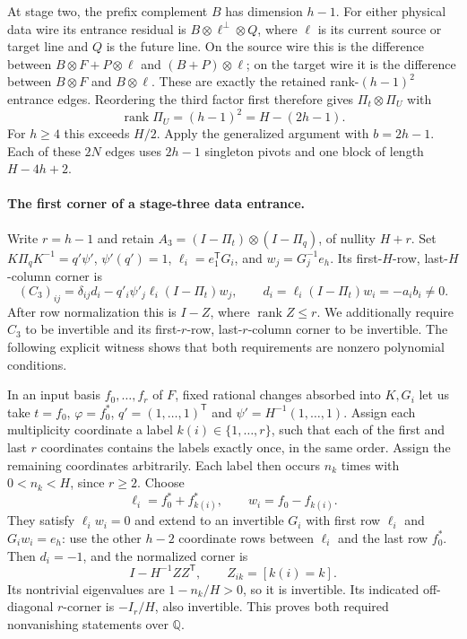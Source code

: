 At stage two, the prefix complement $B$ has dimension $h-1$.
For either physical data wire its entrance residual is
$B\otimes\ell^\perp\otimes Q$, where $\ell$ is its current source
or target line and $Q$ is the future line. On the source wire this
is the difference between $B\otimes F+P\otimes\ell$ and
$(B+P)\otimes\ell$; on the target wire it is the difference between
$B\otimes F$ and $B\otimes\ell$. These are exactly the retained
rank-$(h-1)^2$ entrance edges. Reordering the third factor first
therefore gives $\Pi_t\otimes\Pi_U$ with
\[
 \operatorname{rank}\Pi_U=(h-1)^2=H-(2h-1).
\]
For $h\ge4$ this exceeds $H/2$. Apply the generalized argument with
$b=2h-1$. Each of these $2N$ edges uses $2h-1$ singleton pivots and
one block of length $H-4h+2$.

\paragraph{The first corner of a stage-three data entrance.}
Write $r=h-1$ and retain
$A_3=(I-\Pi_t)\otimes(I-\Pi_q)$, of nullity $H+r$.
Set $K\Pi_qK^{-1}=q'\psi'$, $\psi'(q')=1$,
$\ell_i=e_1^{\mathsf T}G_i$, and $w_j=G_j^{-1}e_h$.
Its first-$H$-row, last-$H$-column corner is
\[
 (C_3)_{ij}=\delta_{ij}d_i-q'_i\psi'_j\ell_i(I-\Pi_t)w_j,
 \qquad d_i=\ell_i(I-\Pi_t)w_i=-a_i b_i\ne0.
\]
After row normalization this is $I-Z$, where $\operatorname{rank}Z\le r$.
We additionally require $C_3$ to be invertible and its first-$r$-row,
last-$r$-column corner to be invertible. The following explicit witness
shows that both requirements are nonzero polynomial conditions.

In an input basis $f_0,\ldots,f_r$ of $F$, fixed rational changes
absorbed into $K,G_i$ let us take $t=f_0$,
$\varphi=f_0^*$, $q'=(1,\ldots,1)^{\mathsf T}$ and
$\psi'=H^{-1}(1,\ldots,1)$. Assign each multiplicity coordinate a
label $k(i)\in\{1,\ldots,r\}$, such that each of the first and last
$r$ coordinates contains the labels exactly once, in the same order.
Assign the remaining coordinates arbitrarily. Each label then occurs
$n_k$ times with $0<n_k<H$, since $r\ge2$.
Choose
\[
 \ell_i=f_0^*+f_{k(i)}^*,\qquad
 w_i=f_0-f_{k(i)}.
\]
They satisfy $\ell_iw_i=0$ and extend to an invertible $G_i$ with
first row $\ell_i$ and $G_iw_i=e_h$: use the other $h-2$ coordinate
rows between $\ell_i$ and the last row $f_0^*$.
Then $d_i=-1$, and the normalized corner is
\[
 I-H^{-1}ZZ^{\mathsf T},\qquad Z_{ik}=[k(i)=k].
\]
Its nontrivial eigenvalues are $1-n_k/H>0$, so it is invertible.
Its indicated off-diagonal $r$-corner is $-I_r/H$, also invertible.
This proves both required nonvanishing statements over $\mathbb Q$.

